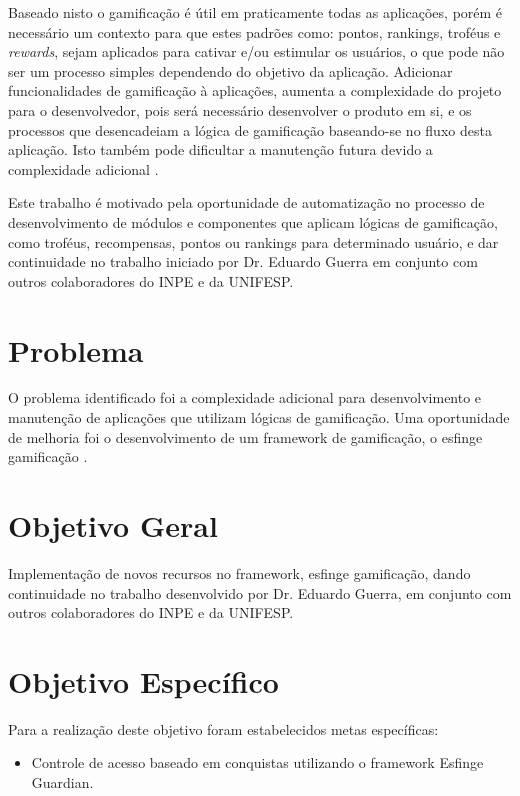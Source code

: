 \par Baseado nisto o gamificação é útil em praticamente todas as aplicações, porém é necessário um contexto para que estes padrões como: pontos, rankings, troféus e \textit{rewards}, sejam aplicados para cativar e/ou estimular os usuários, o que pode não ser um processo simples dependendo do objetivo da aplicação. Adicionar funcionalidades de gamificação à aplicações, aumenta a complexidade do projeto para o desenvolvedor, pois será necessário desenvolver o produto em si, e os processos que desencadeiam a lógica de gamificação baseando-se no fluxo desta aplicação. Isto também pode dificultar a manutenção futura devido a complexidade adicional \cite{guerra2017approach}.

\par Este trabalho é motivado pela oportunidade de automatização no processo de desenvolvimento de módulos e componentes que aplicam lógicas de gamificação, como troféus, recompensas, pontos ou rankings para determinado usuário, e dar continuidade no trabalho iniciado por Dr. Eduardo Guerra em conjunto com outros colaboradores do INPE e da UNIFESP.

\section{Problema}

\par O problema identificado foi a complexidade adicional para desenvolvimento e manutenção de aplicações que utilizam lógicas de gamificação. Uma oportunidade de melhoria foi o desenvolvimento de um framework de gamificação, o esfinge gamificação \cite{guerra2017approach}.

\section{Objetivo Geral}

\par Implementação de novos recursos no framework, esfinge gamificação, dando continuidade no trabalho desenvolvido por Dr. Eduardo Guerra, em conjunto com outros colaboradores do INPE e da UNIFESP. 

\section{Objetivo Espec\'ifico}

\par Para a realização deste objetivo foram estabelecidos metas específicas:
\begin{itemize}
    \item Controle de acesso baseado em conquistas utilizando o framework Esfinge Guardian.
\end{itemize}

